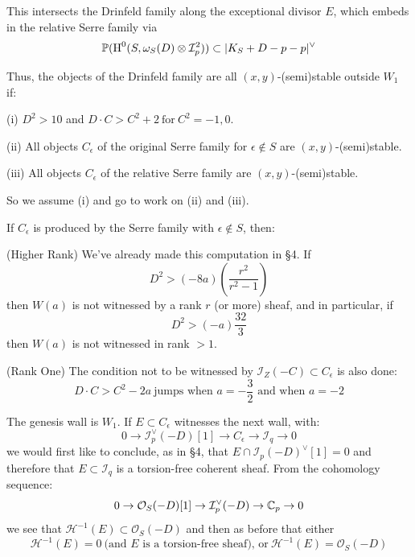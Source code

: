 \documentclass{amsart}
\begin{document}
This intersects the Drinfeld family along the exceptional divisor $E$, which embeds in the 
relative Serre family via 
\[ {\mathbb P}(\mbox{H}^0(S, \omega_S(D) \otimes {\mathcal I}_p^2)) \subset |K_S + D - p - p|^\vee \] 


Thus, the objects of the  Drinfeld family are all $(x,y)$-(semi)stable outside $W_1$ if:  

\medskip

(i) $D^2 > 10$ and $D \cdot C > C^2 + 2 \ \mbox{for} \ C^2 = -1,0$.

\medskip

(ii) All objects  $C_\epsilon$ of the original Serre family for $\epsilon \not\in S$  are $(x,y)$-(semi)stable. 

\medskip

(iii) All objects $C_\epsilon$ of the relative Serre family are $(x,y)$-(semi)stable. 

\medskip

So we assume (i) and go to work on (ii) and (iii). 

\medskip

  If $C_\epsilon$ is produced by the Serre family with $\epsilon \not\in S$, then: 

\medskip

(Higher Rank) We've already made this computation in \S 4. If 
\[ D^2 > (-8a)\left( \frac{r^2}{r^2 -1}\right)  \] 
then $W(a)$ is not witnessed by a rank $r$ (or more) sheaf, and in particular, if 
\[ D^2 > (-a) \frac{32}3 \] 
then $W(a)$ is not witnessed in rank $> 1$. 

\medskip

(Rank One) The condition not to be witnessed by ${\mathcal I}_Z(-C) \subset C_\epsilon$ is also done:  
\[ D\cdot C > C^2  - 2a \ \mbox{jumps when $a = -\frac 32$ and when $a = -2$}\] 


 The genesis wall is $W_1$. 
If  $E \subset C_\epsilon$ witnesses  the next wall, with: 
\[ 0 \rightarrow {\mathcal I}_p^\vee(-D)[1] \rightarrow C_\epsilon \rightarrow {\mathcal I}_q \rightarrow 0 \]  
we would first like to conclude, as in \S 4, that 
$E \cap {\mathcal I}_p(-D)^\vee[1] = 0$ 
 and therefore that 
$E \subset {\mathcal I}_q$ is a torsion-free coherent sheaf. 
From the cohomology sequence:
\[ 0 \rightarrow {\mathcal O}_S(-D)[1] \rightarrow {\mathcal I}_p^\vee(-D) \rightarrow {\mathbb C}_p \rightarrow 0 \] 
we see that
$ {\mathcal H}^{-1}(E) \subset {\mathcal O}_S(-D)$ and then as before that either
\[ {\mathcal H}^{-1}(E) = 0 \ \mbox{(and $E$ is a torsion-free sheaf), or} \ {\mathcal H}^{-1}(E) = {\mathcal O}_S(-D) \] 
\end{document}
